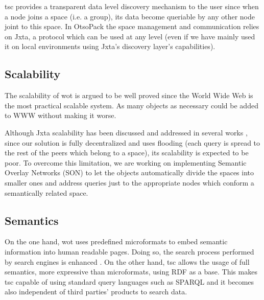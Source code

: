 \ac{tsc} provides a transparent data level discovery mechanism to the user since when a node joins a space (i.e. a group), its data become queriable by any other
node joint to this space. In OtsoPack the space management and communication relies on Jxta, a protocol which can be used at any level (even if we
have mainly used it on local environments using Jxta's discovery layer's capabilities).

\subsection{Scalability}
The scalability of \ac{wot} is argued to be well proved since the World Wide Web is the most practical scalable system. As many objects as
necessary could be added to WWW without making it worse. 

Although Jxta scalability has been discussed and addressed in several works \citep{antoniu_performance_2007}, since our solution is fully decentralized
and uses flooding (each query is spread to the rest of the peers which belong to a space), its scalability is expected to be poor. To overcome this limitation,
we are working on implementing Semantic Overlay Networks (SON) to let the objects automatically divide the spaces into smaller ones and address queries
just to the appropriate nodes which conform a semantically related space.

% 

\subsection{Semantics}
On the one hand, \ac{wot} uses predefined microformats to embed semantic information into human readable pages. Doing so, the search process performed
by search engines is enhanced \citep{guinard_internet_2011}. On the other hand, \ac{tsc} allows the usage of full semantics, more expressive than microformats,
using RDF as a base. This makes \ac{tsc} capable of using standard query languages such as SPARQL and it becomes also independent of third parties' products to search data.



